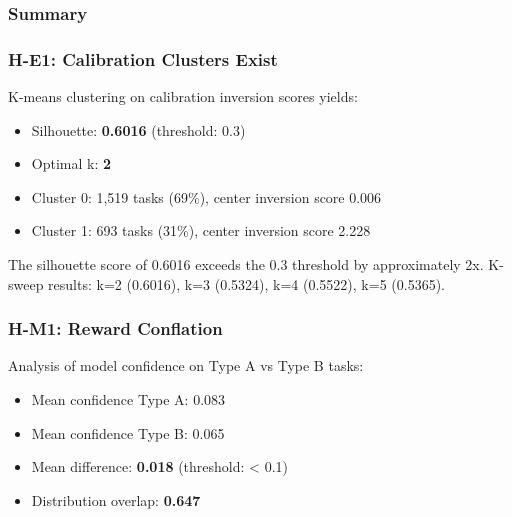 
\subsubsection{Summary}

\begin{table}[htbp]
\centering
{}
\end{table}

\subsubsection{H-E1: Calibration Clusters Exist}

K-means clustering on calibration inversion scores yields:

\begin{itemize}
\item Silhouette: \textbf{0.6016} (threshold: 0.3)
\item Optimal k: \textbf{2}
\item Cluster 0: 1,519 tasks (69\%), center inversion score 0.006
\item Cluster 1: 693 tasks (31\%), center inversion score 2.228
\end{itemize}

The silhouette score of 0.6016 exceeds the 0.3 threshold by approximately 2x. K-sweep results: k=2 (0.6016), k=3 (0.5324), k=4 (0.5522), k=5 (0.5365).

\subsubsection{H-M1: Reward Conflation}

Analysis of model confidence on Type A vs Type B tasks:

\begin{itemize}
\item Mean confidence Type A: 0.083
\item Mean confidence Type B: 0.065
\item Mean difference: \textbf{0.018} (threshold: < 0.1)
\item Distribution overlap: \textbf{0.647}
\end{itemize}

